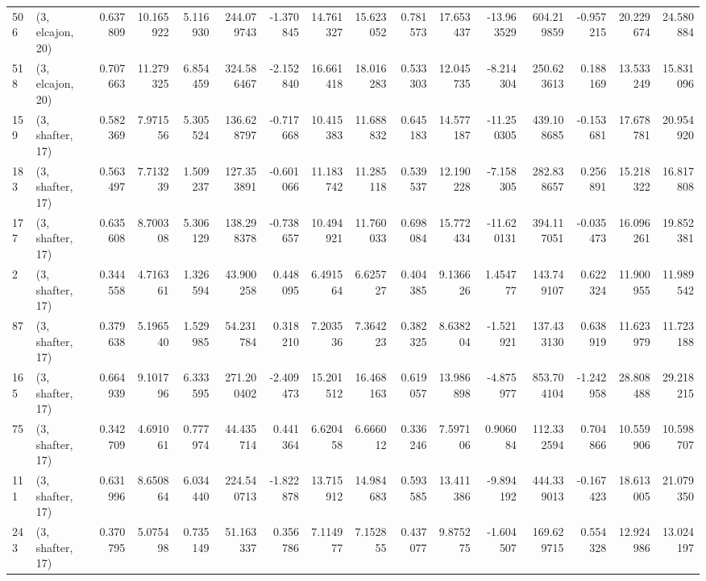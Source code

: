 \begin{tabular}{llrrrrrrrrrrrrrr}
506 &  (3, elcajon, 20) &   0.637809 &  10.165922 &   5.116930 &   244.079743 &  -1.370845 &  14.761327 &  15.623052 &  0.781573 &  17.653437 & -13.963529 &    604.219859 &  -0.957215 &  20.229674 &   24.580884 \\
518 &  (3, elcajon, 20) &   0.707663 &  11.279325 &   6.854459 &   324.586467 &  -2.152840 &  16.661418 &  18.016283 &  0.533303 &  12.045735 &  -8.214304 &    250.623613 &   0.188169 &  13.533249 &   15.831096 \\
159 &  (3, shafter, 17) &   0.582369 &   7.971556 &   5.305524 &   136.628797 &  -0.717668 &  10.415383 &  11.688832 &  0.645183 &  14.577187 & -11.250305 &    439.108685 &  -0.153681 &  17.678781 &   20.954920 \\
183 &  (3, shafter, 17) &   0.563497 &   7.713239 &   1.509237 &   127.353891 &  -0.601066 &  11.183742 &  11.285118 &  0.539537 &  12.190228 &  -7.158305 &    282.838657 &   0.256891 &  15.218322 &   16.817808 \\
177 &  (3, shafter, 17) &   0.635608 &   8.700308 &   5.306129 &   138.298378 &  -0.738657 &  10.494921 &  11.760033 &  0.698084 &  15.772434 & -11.620131 &    394.117051 &  -0.035473 &  16.096261 &   19.852381 \\
2   &  (3, shafter, 17) &   0.344558 &   4.716361 &   1.326594 &    43.900258 &   0.448095 &   6.491564 &   6.625727 &  0.404385 &   9.136626 &   1.454777 &    143.749107 &   0.622324 &  11.900955 &   11.989542 \\
87  &  (3, shafter, 17) &   0.379638 &   5.196540 &   1.529985 &    54.231784 &   0.318210 &   7.203536 &   7.364223 &  0.382325 &   8.638204 &  -1.521921 &    137.433130 &   0.638919 &  11.623979 &   11.723188 \\
165 &  (3, shafter, 17) &   0.664939 &   9.101796 &   6.333595 &   271.200402 &  -2.409473 &  15.201512 &  16.468163 &  0.619057 &  13.986898 &  -4.875977 &    853.704104 &  -1.242958 &  28.808488 &   29.218215 \\
75  &  (3, shafter, 17) &   0.342709 &   4.691061 &   0.777974 &    44.435714 &   0.441364 &   6.620458 &   6.666012 &  0.336246 &   7.597106 &   0.906084 &    112.332594 &   0.704866 &  10.559906 &   10.598707 \\
111 &  (3, shafter, 17) &   0.631996 &   8.650864 &   6.034440 &   224.540713 &  -1.822878 &  13.715912 &  14.984683 &  0.593585 &  13.411386 &  -9.894192 &    444.339013 &  -0.167423 &  18.613005 &   21.079350 \\
243 &  (3, shafter, 17) &   0.370795 &   5.075498 &   0.735149 &    51.163337 &   0.356786 &   7.114977 &   7.152855 &  0.437077 &   9.875275 &  -1.604507 &    169.629715 &   0.554328 &  12.924986 &   13.024197 \\

\end{tabular}
